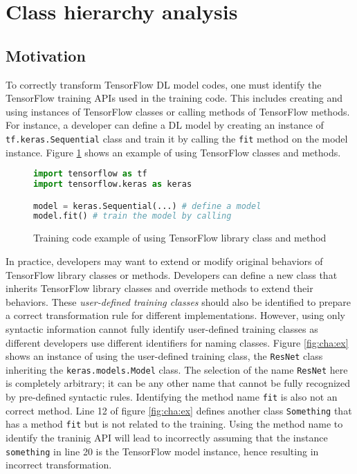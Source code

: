 \section{Class hierarchy analysis}\label{sec:cha}

\subsection{Motivation}

To correctly transform TensorFlow DL model codes,
one must identify the TensorFlow training APIs used in the training code.
This includes creating and using instances of TensorFlow classes or
calling methods of TensorFlow methods. 
For instance, a developer can define a DL model by creating an instance of
{\tt tf.keras.Sequential} class and train it by calling the
{\tt fit} method on the model instance.
Figure \ref{fig:cha:tfex} shows an example of using
TensorFlow classes and methods.

\begin{figure}[h]
\begin{lstlisting}[language=Python]
import tensorflow as tf
import tensorflow.keras as keras

model = keras.Sequential(...) # define a model
model.fit() # train the model by calling 
\end{lstlisting}
  \caption{Training code example of using TensorFlow library class and method}
  \label{fig:cha:tfex}
\end{figure}

In practice, developers may want to extend or modify original behaviors
of TensorFlow library classes or methods.  
Developers can define a new class that inherits TensorFlow library classes
and override methods to extend their behaviors. 
These \textit{user-defined training classes}
should also be identified to prepare a correct transformation rule 
for different implementations.  However, using only syntactic information 
cannot fully identify user-defined training classes
as different developers use different identifiers for naming classes.
Figure \ref{fig:cha:ex} shows an instance of using the
user-defined training class, the {\tt ResNet} class inheriting
the {\tt keras.models.Model} class.
The selection of the name {\tt ResNet} here is completely arbitrary;
it can be any other name that cannot be fully recognized by
pre-defined syntactic rules.
Identifying the method name {\tt fit} is also not an correct method.
Line 12 of figure \ref{fig:cha:ex} defines another class {\tt Something}
that has a method {\tt fit} but is not related to the training.
Using the method name to identify the traninig API will lead to
incorrectly assuming that the instance {\tt something} in line 20
is the TensorFlow model instance, hence resulting in incorrect transformation.

